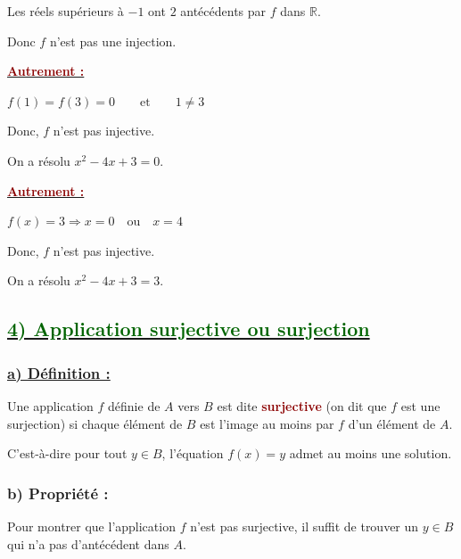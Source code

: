 \documentclass[12pt,a4paper]{article}
\begin{document}
Les réels supérieurs à $-1$ ont $2$ antécédents par $f$ dans
$\mathbb{R}$.

Donc $f$ n'est pas une injection.


\underline{\textbf{\textcolor{darkred}{Autrement :}}}

\(
f(1)=f(3)=0
\qquad\text{et}\qquad
1\neq3
\)

Donc, $f$ n'est pas injective.

On a résolu
\(
x^2-4x+3=0.
\)


\underline{\textbf{\textcolor{darkred}{Autrement :}}}

\(
f(x)=3
\Longrightarrow
x=0\quad\text{ou}\quad x=4
\)

Donc, $f$ n'est pas injective.

On a résolu
\(
x^2-4x+3=3.
\)

\subsection*{\underline{\textbf{\textcolor{darkgreen}{4) Application surjective ou surjection}}}}

\subsubsection*{\underline{\textbf{a) Définition :}}}

Une application $f$ définie de $A$ vers $B$ est dite
\textcolor{darkred}{\textbf{surjective}} (on dit que $f$ est une surjection)
si chaque élément de $B$ est l'image au moins par $f$ d'un élément de $A$.

C'est-à-dire pour tout $y\in B$, l'équation $f(x)=y$ admet au moins une solution.


\subsubsection*{\textbf{b) Propriété :}}

Pour montrer que l'application $f$ n'est pas surjective, il suffit de trouver
un $y\in B$ qui n'a pas d'antécédent dans $A$.
\end{document}

